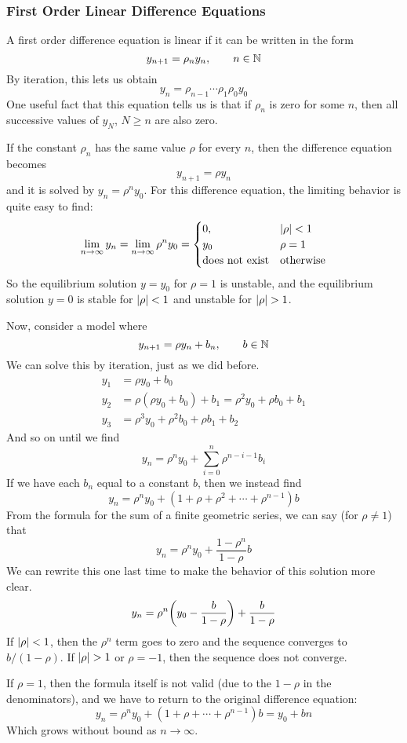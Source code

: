 \subsubsection{First Order Linear Difference Equations}
A first order difference equation is linear if it can be written in the form
\[ y_{n+1} = \rho_ny_n, \quad\quad n\in\mathbb{N}\]
By iteration, this lets us obtain
\[ y_n = \rho_{n-1}\cdots\rho_1\rho_0 y_0 \]
One useful fact that this equation tells us is that if $\rho_n$ is zero for some $n$, then all successive values of $y_N$, $N\geq n$ are also zero. \par
If the constant $\rho_n$ has the same value $\rho$ for every $n$, then the difference equation becomes
\[ y_{n+1} = \rho y_n\]
and it is solved by $y_n = \rho^n y_0$. For this difference equation, the limiting behavior is quite easy to find:
\[ \lim_{n\to\infty} y_n = \lim_{n\to\infty}\rho^n y_0 = \begin{cases}
    0, & \abs{\rho} < 1 \\
    y_0 & \rho = 1 \\
    \text{does not exist} & \text{otherwise}
\end{cases}\]
So the equilibrium solution $y = y_0$ for $\rho = 1$ is unstable, and the equilibrium solution $ y = 0$ is stable for $\abs{\rho} < 1$ and unstable for $\abs{\rho} > 1$. \par
Now, consider a model where
\[ y_{n+1} = \rho y_n + b_n, \quad \quad b\in\mathbb{N}\]
We can solve this by iteration, just as we did before. 
\begin{align*}
    y_1 &= \rho y_0 + b_0 \\
    y_2 &= \rho (\rho y_0 + b_0) + b_1 = \rho^2 y_0 + \rho b_0 + b_1 \\
    y_3 &= \rho^3 y_0 + \rho^2 b_0 + \rho b_1 + b_2
\end{align*}
And so on until we find
\[ y_n = \rho^n y_0 + \sum_{i=0}^n \rho^{n-i-1}b_i \]
If we have each $b_n$ equal to a constant $b$, then we instead find
\[ y_n = \rho^n y_0 + (1 + \rho + \rho^2 + \cdots + \rho^{n-1})b\]
From the formula for the sum of a finite geometric series, we can say (for $\rho \neq 1$) that
\[ y_n = \rho^n y_0 + \frac{1-\rho^n}{1-\rho}b\]
We can rewrite this one last time to make the behavior of this solution more clear.
\[ y_n = \rho^n \pqty{y_0 - \frac{b}{1-\rho}} + \frac{b}{1-\rho} \]
If $\abs{\rho} < 1$, then the $\rho^n$ term goes to zero and the sequence converges to $b/(1-\rho)$. If $\abs{\rho} > 1$ or $\rho = -1$, then the sequence does not converge. \par 
If $\rho = 1$, then the formula itself is not valid (due to the $1-\rho$ in the denominators), and we have to return to the original difference equation:
\[ y_n = \rho^n y_0 + (1 + \rho + \cdots + \rho^{n-1})b = y_0 + bn\]
Which grows without bound as $n\to\infty$.